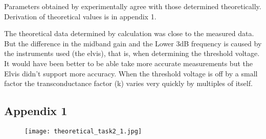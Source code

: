 Parameters obtained by experimentally agree with those determined theoretically. Derivation of theoretical values is in appendix 1.

The theoretical data determined by calculation was close to the measured data. But the difference in the midband gain and the Lower 3dB frequency is caused by the instruments used (the elvis), that is, when determining the threshold voltage. It would have been better to be able take more accurate measurements but the Elvis didn't support more accuracy. When the threshold voltage is off by a small factor the  transconductance factor (k) varies very quickly by multiples of itself. 


\pagebreak
\subsection*{Appendix 1}
\begin{figure}[h!]
\texttt{[image: theoretical\_task2\_1.jpg]}
\end{figure}
